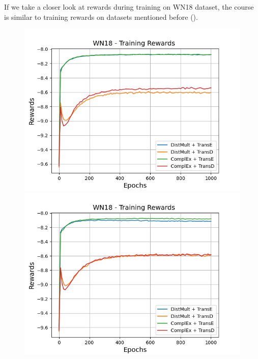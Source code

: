If we take a closer look at rewards during training on \textsc{WN18} dataset, the course is similar to training rewards on datasets mentioned before ().
\begin{figure}[H]
    \centering
    \begin{minipage}{.5\textwidth}
      \centering
      \includegraphics[width=0.9\linewidth]{figures/results/gan_train/not_pretrained/uncertainty/max_distribution/entropy/wn18/1k_epochs/uncertainty_wn18_rew.png}
    \end{minipage}%
    \begin{minipage}{.5\textwidth}
      \centering
      \includegraphics[width=0.9\linewidth]{figures/results/gan_train/not_pretrained/uncertainty/max_distribution/least_confidence/wn18/uncertainty_wn18_rew.png}
    \end{minipage}
    \begin{minipage}{.5\textwidth}

\end{minipage}
\end{figure}
